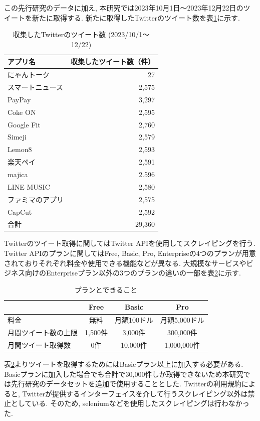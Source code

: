 \noindent
この先行研究のデータに加え, 本研究では2023年10月1日〜2023年12月22日のツイートを新たに取得する. 新たに取得したTwitterのツイート数を表\ref{tb:rawtweetnum2023}に示す. 

\begin{table}[H]
  \caption{収集したTwitterのツイート数 (2023/10/1〜12/22) }
  \label{tb:rawtweetnum2023}
  \begin{center}
  \begin{tabular}{l|r}
    \hline
    アプリ名&収集したツイート数（件）\\\hline\hline
    にゃんトーク&27\\\hline
    スマートニュース&2,575\\\hline
    PayPay&3,297\\\hline
    Coke ON&2,595\\\hline
    Google Fit&2,760\\\hline
    Simeji&2,579\\\hline
    Lemon8&2,593\\\hline
    楽天ペイ&2,591\\\hline
    majica&2.596\\\hline
    LINE MUSIC&2,580\\\hline
    ファミマのアプリ&2,575\\\hline
    CapCut&2,592\\\hline\hline
    合計&29,360
  \end{tabular}\end{center}
\end{table}

Twitterのツイート取得に関してはTwitter APIを使用してスクレイピングを行う. Twitter APIのプランに関してはFree, Basic, Pro, Enterpriseの4つのプランが用意されておりそれぞれ料金や使用できる機能などが異なる. 大規模なサービスやビジネス向けのEnterpriseプラン以外の3つのプランの違いの一部を表\ref{tb:xplan}に示す. 

\begin{table}[H]
  \caption{プランとできること}
  \label{tb:xplan}
  \begin{center}
  \begin{tabular}{l|c|c|c}
    \hline
    &Free&Basic&Pro \\\hline\hline
    料金&無料&月額100ドル&月額5,000ドル \\\hline
    月間ツイート数の上限&1,500件&3,000件&300,000件 \\\hline
    月間ツイート取得数&0件&10,000件&1,000,000件 \\\hline
  \end{tabular}\end{center}
\end{table}
表\ref{tb:xplan}よりツイートを取得するためにはBasicプラン以上に加入する必要がある. Basicプランに加入した場合でも合計で30,000件しか取得できないため本研究では先行研究のデータセットを追加で使用することとした. Twitterの利用規約によると, Twitterが提供するインターフェイスを介して行うスクレイピング以外は禁止としている. そのため, seleniumなどを使用したスクレイピングは行わなかった.  

